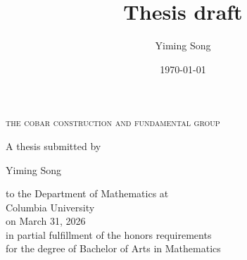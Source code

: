 \documentclass{amsart}
\title{Thesis draft}
\author{Yiming Song}
\date{\today}
\begin{document}
\begin{titlepage}
    \centering
    
  
    
    {\huge\scshape the cobar construction and fundamental group\par}
    \vspace{1.5cm}
    
    {A thesis submitted by} \\
    {\Large Yiming Song\par}
    \vspace{1.5cm}
    {to the Department of Mathematics at}\\
    {Columbia University} \\
    {on March 31, 2026}\\

    \vspace{1.5cm}
    {in partial fulfillment of the honors requirements} \\
    for the degree of Bachelor of Arts in Mathematics

\end{titlepage}

\setcounter{tocdepth}{2}
\tableofcontents
\thispagestyle{empty}

\newpage
{}   %

\newpage
{}  






\newpage



% 
\end{document}

